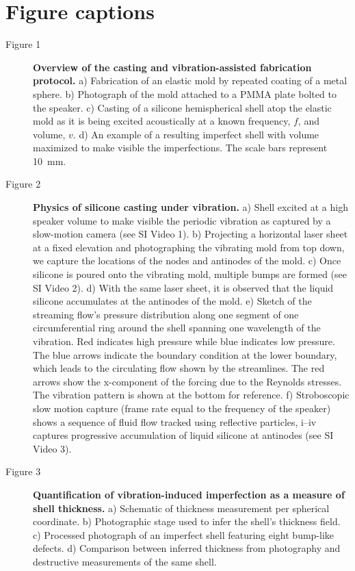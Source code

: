 \documentclass[twocolumn,letter,11pt]{article}
\begin{document}
\section*{Figure captions} 
\begin{description}
\item[Figure 1] \textbf{Overview of the casting and vibration-assisted fabrication protocol.} a) Fabrication of an elastic mold by repeated coating of a metal sphere. b) Photograph of the mold attached to a PMMA plate bolted to the speaker. c) Casting of a silicone hemispherical shell atop the elastic mold as it is being excited acoustically at a known frequency, $f$, and volume, $v$. d) An example of a resulting imperfect shell with volume maximized to make visible the imperfections. The scale bars represent \SI{10}{\milli\metre}.
\item[Figure 2] \textbf{Physics of silicone casting under vibration.}
a) Shell excited at a high speaker volume to make visible the periodic vibration as captured by a slow-motion camera (see SI Video 1). b) Projecting a horizontal laser sheet at a fixed elevation and photographing the vibrating mold from top down, we capture the locations of the nodes and antinodes of the mold. c) Once silicone is poured onto the vibrating mold, multiple bumps are formed (see SI Video 2). d) With the same laser sheet, it is observed that the liquid silicone accumulates at the antinodes of the mold. e) Sketch of the streaming flow's pressure distribution along one segment of one circumferential ring around the shell spanning one wavelength of the vibration. Red indicates high pressure while blue indicates low pressure. The blue arrows indicate the boundary condition at the lower boundary, which leads to the circulating flow shown by the streamlines. The red arrows show the x-component of the forcing due to the Reynolds stresses. The vibration pattern is shown at the bottom for reference. f) Stroboscopic slow motion capture (frame rate equal to the frequency of the speaker) shows a sequence of fluid flow tracked using reflective particles, i–iv captures progressive accumulation of liquid silicone at antinodes (see SI Video 3).
\item[Figure 3] \textbf{Quantification of vibration-induced imperfection as a measure of shell thickness.} a) Schematic of thickness measurement per spherical coordinate. b) Photographic stage used to infer the shell's thickness field. c) Processed photograph of an imperfect shell featuring eight bump-like defects. d) Comparison between inferred thickness from photography and destructive measurements of the same shell.

\end{description}
\end{document}
